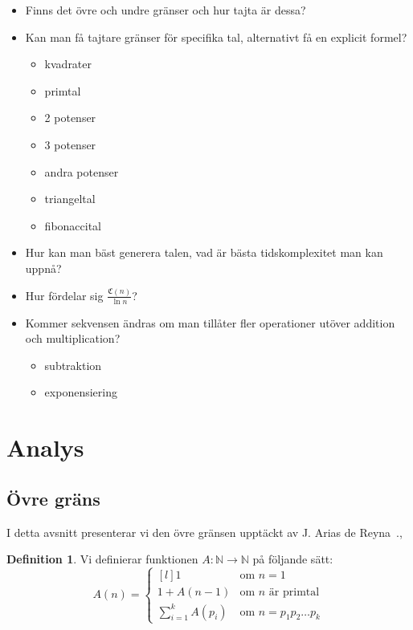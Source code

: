 \documentclass[a4paper,titlepage]{article}
\newcommand{\N}{\mathbb{N}}
\newcommand{\C}[1]{\mathfrak C \left( #1 \right)}
\theoremstyle{definition}
\newtheorem{definition}{Definition}
\begin{document}
        \begin{itemize}
            \item Finns det övre och undre gränser och hur tajta är dessa?
            \item Kan man få tajtare gränser för specifika tal, alternativt få
                en explicit formel?
                \begin{itemize}
                    \item kvadrater
                    \item primtal
                    \item 2 potenser
                    \item 3 potenser
                    \item andra potenser
                    \item triangeltal
                    \item fibonaccital
                \end{itemize}
            \item Hur kan man bäst generera talen, vad är bästa tidskomplexitet
                man kan uppnå?
            \item Hur fördelar sig $\frac{\C{n}}{\ln{n}}$?
            \item Kommer sekvensen ändras om man tillåter fler operationer
                utöver addition och multiplication?
                \begin{itemize}
                    \item subtraktion 
                    \item exponensiering
                \end{itemize}
        \end{itemize}


\section{Analys}

    \subsection{Övre gräns}

    I detta avsnitt presenterar vi den övre gränsen upptäckt av J. Arias de
    Reyna~\cite{spansk}.,
    \begin{definition}
        Vi definierar funktionen $A:\N\to\N$ på följande sätt:
        $$ A(n) = \left\{ \begin{matrix*}[l] 1 & \text{om } n=1 \\ 1+A(n-1) & \text{om $n$ är primtal} \\ \sum_{i=1}^kA(p_i) & \text{om } n=p_1p_2 \ldots p_k \end{matrix*} \right. $$
    \end{definition}
\end{document}
